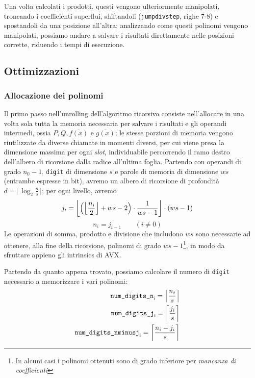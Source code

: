 Una volta calcolati i prodotti, questi vengono ulteriormente manipolati, troncando i coefficienti superflui, shiftandoli (\texttt{jumpdivstep}, righe 7-8) e 
spostandoli da una posizione all'altra; analizzando come questi polinomi vengono manipolati, possiamo andare a salvare i risultati direttamente nelle posizioni
corrette, riduendo i tempi di esecuzione.

\subsection*{\textbf{Ottimizzazioni}}\label{ott}

\subsubsection*{Allocazione dei polinomi}
Il primo passo nell'unrolling dell'algoritmo ricorsivo consiste nell'allocare in una volta sola tutta la memoria necessaria per salvare
i risultati e gli operandi intermedi, ossia $ P, Q, \bar{f(x)}$ e $\bar{g(x)}$; le stesse porzioni di memoria vengono riutilizzate da diverse
chiamate in momenti diversi, per cui viene presa la dimensione massima per ogni \textit{slot}, individuabile percorrendo il ramo destro dell'albero di ricorsione
dalla radice all'ultima foglia. Partendo con operandi di grado $n_0-1$, \texttt{digit} di dimensione $s$ e parole di memoria di dimensione $ws$
(entrambe espresse in bit), avremo un albero di ricorsione di profondità $d=\lceil \log_{2}\frac{n}{s} \rceil$; per ogni livello, avremo 
\begin{equation*}
    j_{i} = \floor*{\left(\floor*{\frac{n_i}{2}} + ws - 2\right) \cdot \frac{1}{ws-1}} \cdot (ws-1)
\end{equation*}
\begin{equation*}
    n_{i} = j_{i-1} \qquad (i \neq 0)
\end{equation*}
Le operazioni di somma, prodotto e divisione che includono $ws$ sono necessarie ad ottenere, alla fine della ricorsione, polinomi di grado $ws-1$\footnote{In alcuni casi 
i polinomi ottenuti sono di grado inferiore per \textit{mancanza di coefficienti}}, in modo da sfruttare appieno gli intrinsics di AVX.

Partendo da quanto appena trovato, possiamo calcolare il numero di \texttt{digit} necessario a memorizzare i vari polinomi:
\begin{equation*}
    \begin{aligned}
    \mathrm{\texttt{num\_digits\_n}_i} = \ceil*{\frac{n_i}{s}}\\
    \mathrm{\texttt{num\_digits\_j}_i} = \ceil*{\frac{j_i}{s}}\\
    \mathrm{\texttt{num\_digits\_nminusj}_i} = \ceil*{\frac{n_i - j_i}{s}}\\
    \end{aligned}
\end{equation*}

